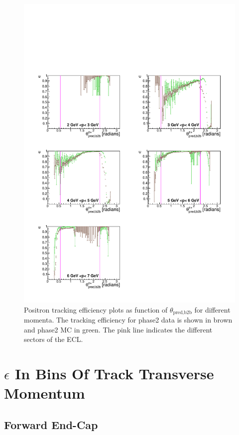 \documentclass[a4paper,11pt,twosided,final,german,openbib,pdftex,listof=totoc,bibliography=totoc]{scrbook}
\begin{document}
\begin{figure}[!htbp]
	\centering
	\includegraphics[width=\textwidth]{Plots/master/xPMThetaep}
	\caption[Momentum $\theta_{\textrm{pred,b2b}}$ Positron Efficiency Phase2]{Positron tracking efficiency plots as function of  $\theta_{\textrm{pred,b2b}}$ for different momenta. The tracking efficiency for phase2 data is shown in brown and phase2 MC in green. The pink line indicates the different sectors of the ECL.}
	\label{plt:xPMThetaep}
\end{figure}

\clearpage

\section{$\epsilon$ In Bins Of Track Transverse Momentum}

\subsection{Forward End-Cap}
\end{document}

